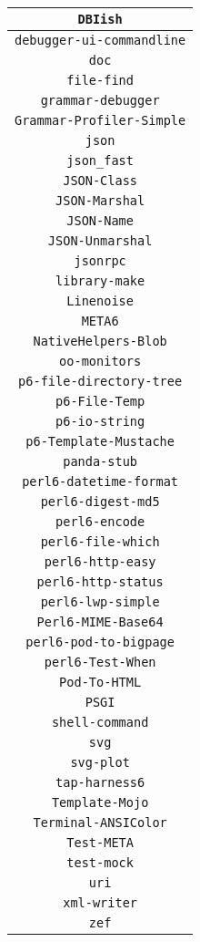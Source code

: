 \documentclass[17pt,english]{extarticle}
\providecommand{\tabularnewline}{\\}
\begin{document}
\begin{longtable}{|c|}
\hline 
\texttt{DBIish}\tabularnewline
\hline 
\texttt{debugger-ui-commandline}\tabularnewline
\hline 
\texttt{doc}\tabularnewline
\hline 
\texttt{file-find}\tabularnewline
\hline 
\texttt{grammar-debugger}\tabularnewline
\hline 
\texttt{Grammar-Profiler-Simple}\tabularnewline
\hline 
\texttt{json}\tabularnewline
\hline 
\texttt{json\_fast}\tabularnewline
\hline 
\texttt{JSON-Class}\tabularnewline
\hline 
\texttt{JSON-Marshal}\tabularnewline
\hline 
\texttt{JSON-Name}\tabularnewline
\hline 
\texttt{JSON-Unmarshal}\tabularnewline
\hline 
\texttt{jsonrpc}\tabularnewline
\hline 
\texttt{library-make}\tabularnewline
\hline 
\texttt{Linenoise}\tabularnewline
\hline 
\texttt{META6}\tabularnewline
\hline 
\texttt{NativeHelpers-Blob}\tabularnewline
\hline 
\texttt{oo-monitors}\tabularnewline
\hline 
\texttt{p6-file-directory-tree}\tabularnewline
\hline 
\texttt{p6-File-Temp}\tabularnewline
\hline 
\texttt{p6-io-string}\tabularnewline
\hline 
\texttt{p6-Template-Mustache}\tabularnewline
\hline 
\texttt{panda-stub}\tabularnewline
\hline 
\texttt{perl6-datetime-format}\tabularnewline
\hline 
\texttt{perl6-digest-md5}\tabularnewline
\hline 
\texttt{perl6-encode}\tabularnewline
\hline 
\texttt{perl6-file-which}\tabularnewline
\hline 
\texttt{perl6-http-easy}\tabularnewline
\hline 
\texttt{perl6-http-status}\tabularnewline
\hline 
\texttt{perl6-lwp-simple}\tabularnewline
\hline 
\texttt{Perl6-MIME-Base64}\tabularnewline
\hline 
\texttt{perl6-pod-to-bigpage}\tabularnewline
\hline 
\texttt{perl6-Test-When}\tabularnewline
\hline 
\texttt{Pod-To-HTML}\tabularnewline
\hline 
\texttt{PSGI}\tabularnewline
\hline 
\texttt{shell-command}\tabularnewline
\hline 
\texttt{svg}\tabularnewline
\hline 
\texttt{svg-plot}\tabularnewline
\hline 
\texttt{tap-harness6}\tabularnewline
\hline 
\texttt{Template-Mojo}\tabularnewline
\hline 
\texttt{Terminal-ANSIColor}\tabularnewline
\hline 
\texttt{Test-META}\tabularnewline
\hline 
\texttt{test-mock}\tabularnewline
\hline 
\texttt{uri}\tabularnewline
\hline 
\texttt{xml-writer}\tabularnewline
\hline 
\texttt{zef}\tabularnewline
\hline 
\end{longtable}
\end{document}
